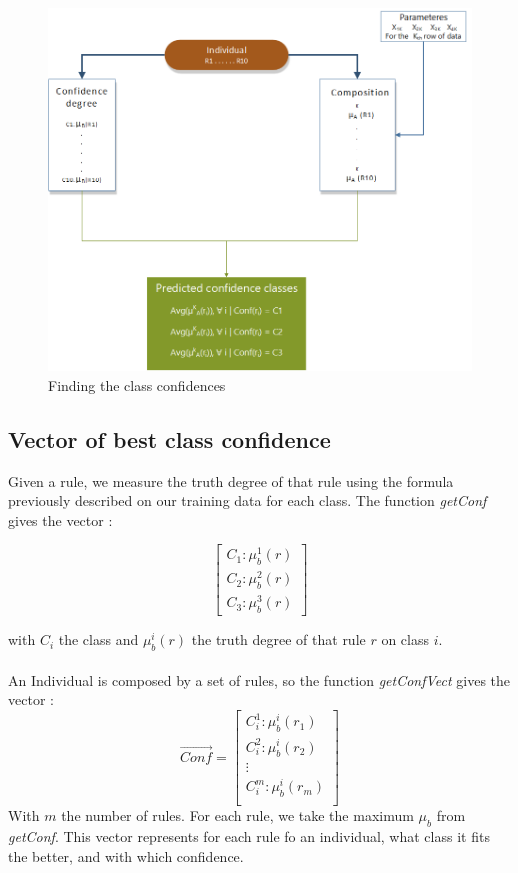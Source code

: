 \documentclass[a4paper,12pt]{article}
\begin{document}
\begin{figure}
\centering
\caption{Finding the class confidences}
\includegraphics[scale=0.3]{fitnessfunct}
\end{figure}
\subsection{Vector of best class confidence}

Given a rule, we measure the truth degree of that rule using the formula previously described on our training data for each class.
The function \textit{getConf} gives the vector :

\[
\begin{bmatrix}
C_1:\mu_b^1(r)\\
C_2:\mu_b^2(r)\\
C_3:\mu_b^3(r)
\end{bmatrix} \]

with $C_i$ the class and $\mu_b^i(r)$ the truth degree of that rule $r$ on class $i$.
\\
\\
An Individual is composed by a set of rules, so the function \textit{getConfVect} gives the vector :
\[
\vec{Conf}=
\begin{bmatrix}
C_i^1:\mu_b^i(r_1)\\
C_i^2:\mu_b^i(r_2)\\
\vdots\\
C_i^m:\mu_b^i(r_m)\\
\end{bmatrix} \]
With $m$ the number of rules. For each rule, we take the maximum $\mu_b$ from \textit{getConf}. This vector represents for each rule fo an individual, what class it fits the better, and with which confidence.
\end{document}
